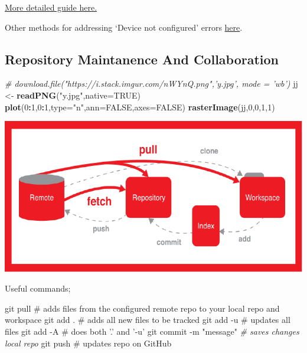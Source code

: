 \documentclass[]{article}
\newenvironment{Shaded}{\begin{snugshade}}{\end{snugshade}}
\newcommand{\KeywordTok}[1]{\textcolor[rgb]{0.13,0.29,0.53}{\textbf{#1}}}
\newcommand{\DataTypeTok}[1]{\textcolor[rgb]{0.13,0.29,0.53}{#1}}
\newcommand{\DecValTok}[1]{\textcolor[rgb]{0.00,0.00,0.81}{#1}}
\newcommand{\StringTok}[1]{\textcolor[rgb]{0.31,0.60,0.02}{#1}}
\newcommand{\CommentTok}[1]{\textcolor[rgb]{0.56,0.35,0.01}{\textit{#1}}}
\newcommand{\OtherTok}[1]{\textcolor[rgb]{0.56,0.35,0.01}{#1}}
\newcommand{\FunctionTok}[1]{\textcolor[rgb]{0.00,0.00,0.00}{#1}}
\newcommand{\OperatorTok}[1]{\textcolor[rgb]{0.81,0.36,0.00}{\textbf{#1}}}
\newcommand{\NormalTok}[1]{#1}
\begin{document}
\href{https://help.github.com/articles/changing-a-remote-s-url/}{\color{blue}More detailed guide here.}

Other methods for addressing `Device not configured' errors
\href{https://stackoverflow.com/questions/40274484/fatal-could-not-read-username-for-https-github-com-device-not-configured}{\color{blue}here}.

\subsection{Repository Maintanence And Collaboration}

\begin{Shaded}
\begin{Highlighting}[]
\CommentTok{# download.file("https://i.stack.imgur.com/nWYnQ.png",'y.jpg', mode = 'wb')}
\NormalTok{jj <-}\StringTok{ }\KeywordTok{readPNG}\NormalTok{(}\StringTok{"y.jpg"}\NormalTok{,}\DataTypeTok{native=}\OtherTok{TRUE}\NormalTok{)}
\KeywordTok{plot}\NormalTok{(}\DecValTok{0}\OperatorTok{:}\DecValTok{1}\NormalTok{,}\DecValTok{0}\OperatorTok{:}\DecValTok{1}\NormalTok{,}\DataTypeTok{type=}\StringTok{"n"}\NormalTok{,}\DataTypeTok{ann=}\OtherTok{FALSE}\NormalTok{,}\DataTypeTok{axes=}\OtherTok{FALSE}\NormalTok{)}
\KeywordTok{rasterImage}\NormalTok{(jj,}\DecValTok{0}\NormalTok{,}\DecValTok{0}\NormalTok{,}\DecValTok{1}\NormalTok{,}\DecValTok{1}\NormalTok{)}
\end{Highlighting}
\end{Shaded}

\includegraphics{Data-Science-Handbook_files/figure-latex/unnamed-chunk-27-1.pdf}

Useful commands;

\begin{Shaded}
\begin{Highlighting}[]
\FunctionTok{git}\NormalTok{ pull    # adds files from the configured remote repo to your local repo and workspace}
\FunctionTok{git}\NormalTok{ add .   # adds all new files to be tracked}
\FunctionTok{git}\NormalTok{ add -u  # updates all files}
\FunctionTok{git}\NormalTok{ add -A  # does both }\StringTok{'.'}\NormalTok{ and }\StringTok{'-u'}
\FunctionTok{git}\NormalTok{ commit -m }\StringTok{"message"} \CommentTok{# saves changes local repo}
\FunctionTok{git}\NormalTok{ push    # updates repo on GitHub}
\end{Highlighting}
\end{Shaded}
\end{document}
